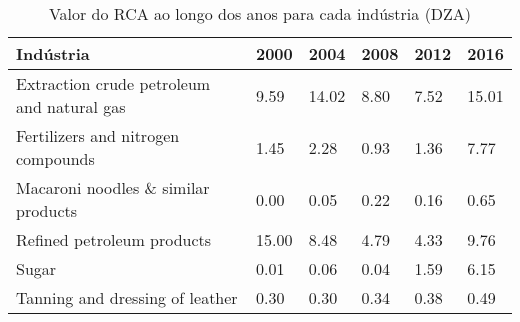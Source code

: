 \begin{table}
\centering
\caption{Valor do RCA ao longo dos anos para cada indústria (DZA)}
\label{tab:ex3-tempo-DZA}
\begin{tabular}{p{6cm}p{1.5cm}p{1.5cm}p{1.5cm}p{1.5cm}p{1.5cm}}
\toprule
                                 Indústria &  2000 &  2004 & 2008 & 2012 &  2016 \\
\midrule
Extraction crude petroleum and natural gas &  9.59 & 14.02 & 8.80 & 7.52 & 15.01 \\
        Fertilizers and nitrogen compounds &  1.45 &  2.28 & 0.93 & 1.36 &  7.77 \\
       Macaroni noodles \& similar products &  0.00 &  0.05 & 0.22 & 0.16 &  0.65 \\
                Refined petroleum products & 15.00 &  8.48 & 4.79 & 4.33 &  9.76 \\
                                     Sugar &  0.01 &  0.06 & 0.04 & 1.59 &  6.15 \\
           Tanning and dressing of leather &  0.30 &  0.30 & 0.34 & 0.38 &  0.49 \\
\bottomrule
\end{tabular}
\end{table}
